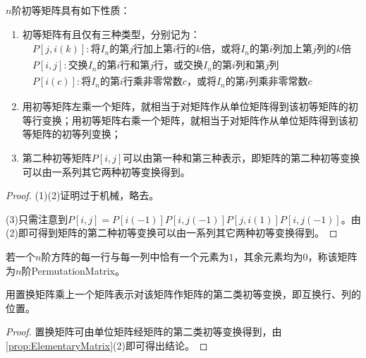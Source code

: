 \begin{property}\label{prop:ElementaryMatrix}
	$n$阶初等矩阵具有如下性质：
	\begin{enumerate}
		\item 初等矩阵有且仅有三种类型，分别记为：
		\begin{gather*}
			P[j,i(k)]:\text{将$I_n$的第$j$行加上第$i$行的$k$倍，或将$I_n$的第$i$列加上第$j$列的$k$倍} \\
			P[i,j]:\text{交换$I_n$的第$i$行和第$j$行，或交换$I_n$的第$i$列和第$j$列} \\
			P[i(c)]:\text{将$I_n$的第$i$行乘非零常数$c$，或将$I_n$的第$i$列乘非零常数$c$}
		\end{gather*}
		\item 用初等矩阵左乘一个矩阵，就相当于对矩阵作从单位矩阵得到该初等矩阵的初等行变换；用初等矩阵右乘一个矩阵，就相当于对矩阵作从单位矩阵得到该初等矩阵的初等列变换；
		\item 第二种初等矩阵$P[i,j]$可以由第一种和第三种表示，即矩阵的第二种初等变换可以由一系列其它两种初等变换得到。
	\end{enumerate}
\end{property}
\begin{proof}
	(1)(2)证明过于机械，略去。\par
	(3)只需注意到$P[i,j]=P[i(-1)]P[i,j(-1)]P[j,i(1)]P[i,j(-1)]$。由(2)即可得到矩阵的第二种初等变换可以由一系列其它两种初等变换得到。
\end{proof}
\begin{definition}
	若一个$n$阶方阵的每一行与每一列中恰有一个元素为$1$，其余元素均为$0$，称该矩阵为$n$阶\gls{PermutationMatrix}。
\end{definition}
\begin{property}\label{prop:PermutationMatrix}
	用置换矩阵乘上一个矩阵表示对该矩阵作矩阵的第二类初等变换，即互换行、列的位置。
\end{property}
\begin{proof}
	置换矩阵可由单位矩阵经矩阵的第二类初等变换得到，由\cref{prop:ElementaryMatrix}(2)即可得出结论。
\end{proof}
